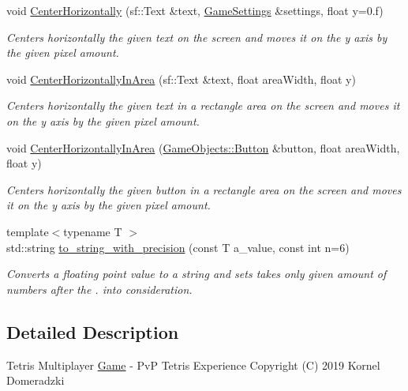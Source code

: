 \begin{DoxyCompactItemize}
void \mbox{\hyperlink{namespace_arktis_engine_ad7ba786370c7c39afcfbb9c3c7972fd5}{Center\+Horizontally}} (sf\+::\+Text \&text, \mbox{\hyperlink{struct_arktis_engine_1_1_game_settings}{Game\+Settings}} \&settings, float y=0.f)
\begin{DoxyCompactList}\small\item\em Centers horizontally the given text on the screen and moves it on the y axis by the given pixel amount. \end{DoxyCompactList}\item 
void \mbox{\hyperlink{namespace_arktis_engine_aed1fe38ca02af676a1fab7f1697e2a6a}{Center\+Horizontally\+In\+Area}} (sf\+::\+Text \&text, float area\+Width, float y)
\begin{DoxyCompactList}\small\item\em Centers horizontally the given text in a rectangle area on the screen and moves it on the y axis by the given pixel amount. \end{DoxyCompactList}\item 
void \mbox{\hyperlink{namespace_arktis_engine_aaf2bcd83bb03743f9f471b74e111d9b7}{Center\+Horizontally\+In\+Area}} (\mbox{\hyperlink{class_game_objects_1_1_button}{Game\+Objects\+::\+Button}} \&button, float area\+Width, float y)
\begin{DoxyCompactList}\small\item\em Centers horizontally the given button in a rectangle area on the screen and moves it on the y axis by the given pixel amount. \end{DoxyCompactList}\item 
{\footnotesize template$<$typename T $>$ }\\std\+::string \mbox{\hyperlink{namespace_arktis_engine_a94b44bcf5156b511b6510658261da5cc}{to\+\_\+string\+\_\+with\+\_\+precision}} (const T a\+\_\+value, const int n=6)
\begin{DoxyCompactList}\small\item\em Converts a floating point value to a string and sets takes only given amount of numbers after the \textquotesingle{}.\textquotesingle{} into consideration. \end{DoxyCompactList}\end{DoxyCompactItemize}


\subsection{Detailed Description}
Tetris Multiplayer \mbox{\hyperlink{class_arktis_engine_1_1_game}{Game}} -\/ PvP Tetris Experience Copyright (C) 2019 Kornel Domeradzki

